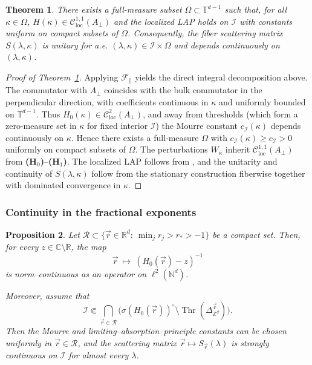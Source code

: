 \documentclass[10pt]{amsart}
\newcommand{\T}{{\mathbb{T}}}
\newcommand{\R}{{\mathbb{R}}}
\newcommand{\C}{{\mathbb{C}}}
\newcommand{\Z}{{\mathbb{Z}}}
\newcommand{\N}{{\mathbb{N}}}
\newcommand{\1}{{\mathbb{I}}}
\newcommand{\Cc}{\mathcal{C}}
\newcommand{\Fc}{\mathcal{F}}
\newcommand{\Ic}{\mathcal{I}}
\newcommand{\Thr}{\operatorname{Thr}}
\numberwithin{equation}{section}
\newtheorem{theorem}{Theorem}[section]%
\newtheorem{proposition}[theorem]{Proposition}%
\begin{document}
\begin{theorem}\label{thm:fiber-LAP}
There exists a full-measure subset $\Omega\subset\T^{d-1}$ such that, for all $\kappa\in\Omega$,
$H(\kappa)\in\Cc^{1,1}_{\mathrm{loc}}(A_\perp)$ and the localized LAP holds on $\Ic$ with constants uniform on compact
subsets of $\Omega$. Consequently, the fiber scattering matrix $S(\lambda,\kappa)$ is unitary for a.e.
$(\lambda,\kappa)\in \Ic\times\Omega$ and depends continuously on $(\lambda,\kappa)$.
\end{theorem}

\begin{proof}[Proof of Theorem~\ref{thm:fiber-LAP}]
Applying $\Fc_\parallel$ yields the direct integral decomposition above.
The commutator with $A_\perp$ coincides with the bulk commutator in the perpendicular direction, with coefficients continuous in $\kappa$ and uniformly bounded on $\T^{d-1}$.
Thus $H_{0}(\kappa)\in\Cc^2_{\mathrm{loc}}(A_\perp)$, and away from thresholds (which form a zero-measure set in $\kappa$ for fixed interior $\Ic$) the Mourre constant $c_\Ic(\kappa)$ depends continuously on $\kappa$.
Hence there exists a full-measure $\Omega$ with $c_\Ic(\kappa)\ge c_\Ic>0$ uniformly on compact subsets of $\Omega$.
The perturbations $W_\kappa$ inherit $\Cc^{1,1}_{\mathrm{loc}}(A_\perp)$ from \textbf{(H$_0$)}--\textbf{(H$_1$)}.
The localized LAP follows from \cite[Thm.~7.4.1]{ABG}, and the unitarity and continuity of $S(\lambda,\kappa)$ follow from the stationary construction fiberwise together with dominated convergence in $\kappa$.
\end{proof}

\subsubsection{Continuity in the fractional exponents}\label{subsubsec:continuity-r}
\begin{proposition}\label{prop:nr-cont}
Let $\mathcal R\subset\{\vec r\in\R^d:\ \min_j r_j>r_*>-1\}$ be a compact set.
Then, for every $z\in\C\setminus\R$, the map
\[
\vec r\ \longmapsto\ (H_0(\vec r)-z)^{-1}
\]
is norm--continuous as an operator on $\ell^2(\N^d)$.

Moreover, assume that
\[
\mathcal I\Subset
\bigcap_{\vec r\in\mathcal R}
\Big(\sigma(H_0(\vec r))^\circ
\setminus \Thr(\Delta_{\Z^d}^{\vec r})\Big).
\]
Then the Mourre and limiting--absorption--principle constants can be chosen
\emph{uniformly} in $\vec r\in\mathcal R$,
and the scattering matrix
$\vec r\mapsto S_{\vec r}(\lambda)$
is strongly continuous on $\mathcal I$
for almost every $\lambda$.
\end{proposition}
\end{document}
